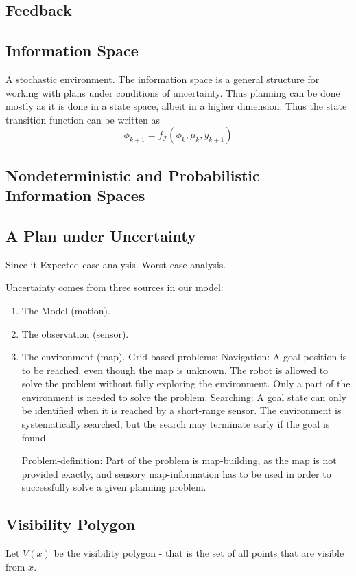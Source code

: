 \subsection{Feedback}

\subsection{Information Space}
A stochastic environment.
The information space is a general structure for working with plans under
conditions of uncertainty. Thus planning can be done mostly as it is done in a
state space, albeit in a higher dimension. Thus the state transition function
can be written as
\[
  \phi_{k+1} = f_{\mathcal{I}}\left( \phi_k, \mu_k, y_{k+1} \right)
\]

\subsection{Nondeterministic and Probabilistic Information Spaces}

\subsection{A Plan under Uncertainty}
Since it
Expected-case analysis. Worst-case analysis.

Uncertainty comes from three sources in our model:
\begin{enumerate}
\item The Model (motion).
\item The observation (sensor).
\item The environment (map).
  Grid-based problems: Navigation: A goal position is to be reached, even though
  the map is unknown. The robot is allowed to solve the problem without fully
  exploring the environment. Only a part of the environment is needed to solve
  the problem.
  Searching: A goal state can only be identified when it is reached by a
  short-range sensor. The environment is systematically searched, but the search
  may terminate early if the goal is found.

  Problem-definition:
  Part of the problem is map-building, as the map is not provided exactly, and
  sensory map-information has to be used in order to successfully solve a given
  planning problem.
\end{enumerate}

\subsection{Visibility Polygon}
Let \(V(x)\) be the visibility polygon - that is the set of all points that are
visible from \(x\).

